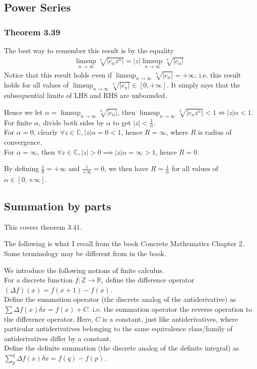 \documentclass{article}
\begin{document}
\subsection{Power Series}
\subsubsection{Theorem 3.39}
The best way to remember this result is by the equality 
\begin{align*}
	\limsup_{n\rightarrow \infty}\sqrt[n]{|c_nz^n|}=|z|\limsup_{n\rightarrow \infty}\sqrt[n]{|c_n|}
\end{align*}
Notice that this result holds even if $\limsup_{n\rightarrow \infty}\sqrt[n]{|c_n|}=+\infty$, i.e. this result holds for all values of $\limsup_{n\rightarrow \infty}\sqrt[n]{|c_n|}\in [0, +\infty]$. It simply says that the subsequential limits of LHS and RHS are unbounded.

Hence we let $\alpha=\limsup_{n\rightarrow \infty}\sqrt[n]{|c_n|}$, then $\limsup_{n\rightarrow \infty}\sqrt[n]{|c_nz^n|}<1 \iff |z|\alpha<1$.\\
For finite $\alpha$, divide both sides by $\alpha$ to get $|z|<\frac{1}{\alpha}$.\\
For $\alpha=0$, clearly $\forall z\in \mathbb{C}, |z|\alpha=0<1$, hence $R=\infty$, where $R$ is radius of convergence.\\
For $\alpha=\infty$, then $\forall z\in \mathbb{C}, |z|>0 \implies |z|\alpha=\infty > 1$, hence $R=0$.

By defining $\frac{1}{0}=+\infty$ and $\frac{1}{+\infty}=0$, we then have $R=\frac{1}{\alpha}$ for all values of $\alpha \in [0, +\infty]$.

\subsection{Summation by parts}
This covers theorem 3.41.

The following is what I recall from the book Concrete Mathematics Chapter 2. Some terminology may be different from in the book.

We introduce the following notions of finite calculus.\\
For a discrete function $f: \mathbb{Z} \rightarrow \mathbb{R}$, define the difference operator $(\Delta f)(x) = f(x+1) - f(x)$.\\
Define the summation operator (the discrete analog of the antiderivative) as $\sum \Delta f(x) \delta x=f(x)+C$. i.e. the summation operator the reverse operation to the difference operator. Here, $C$ is a constant, just like antiderivatives, where particular antiderivatives belonging to the same equivalence class/family of antiderivatives differ by a constant. \\
Define the definite summation (the discrete analog of the definite integral) as $\sum_p^q \Delta f(x) \delta x = f(q) - f(p)$.
\end{document}
